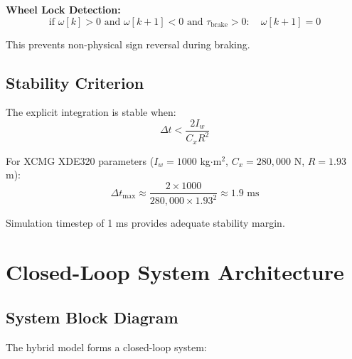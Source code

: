 \documentclass[11pt,a4paper]{article}
\begin{document}
\textbf{Wheel Lock Detection:}
\begin{equation}
\text{if } \omega[k] > 0 \text{ and } \omega[k+1] < 0 \text{ and } \tau_{\text{brake}} > 0: \quad \omega[k+1] = 0
\end{equation}

This prevents non-physical sign reversal during braking.

\subsection{Stability Criterion}

The explicit integration is stable when:
\begin{equation}
\Delta t < \frac{2 I_w}{C_x R^2}
\end{equation}

For XCMG XDE320 parameters ($I_w = 1000$ kg$\cdot$m$^2$, $C_x = 280{,}000$ N, $R = 1.93$ m):
\begin{equation}
\Delta t_{\max} \approx \frac{2 \times 1000}{280{,}000 \times 1.93^2} \approx 1.9 \text{ ms}
\end{equation}

Simulation timestep of 1 ms provides adequate stability margin.

\section{Closed-Loop System Architecture}
\label{sec:closed_loop}

\subsection{System Block Diagram}

The hybrid model forms a closed-loop system:
\end{document}
